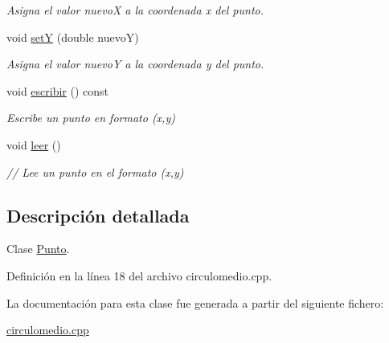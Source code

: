 \begin{DoxyCompactItemize}
\begin{DoxyCompactList}\small\item\em Asigna el valor nuevoX a la coordenada x del punto. \end{DoxyCompactList}\item 
void \hyperlink{classPunto_a6a0f8adb5946f31a7867a06f54d97462}{setY} (double nuevoY)\hypertarget{classPunto_a6a0f8adb5946f31a7867a06f54d97462}{}\label{classPunto_a6a0f8adb5946f31a7867a06f54d97462}

\begin{DoxyCompactList}\small\item\em Asigna el valor nuevoY a la coordenada y del punto. \end{DoxyCompactList}\item 
void \hyperlink{classPunto_afc543b48134f632fa354d8b027954e80}{escribir} () const \hypertarget{classPunto_afc543b48134f632fa354d8b027954e80}{}\label{classPunto_afc543b48134f632fa354d8b027954e80}

\begin{DoxyCompactList}\small\item\em Escribe un punto en formato (x,y) \end{DoxyCompactList}\item 
void \hyperlink{classPunto_a84cc9b0ee2e5b00842e7bff819b80459}{leer} ()\hypertarget{classPunto_a84cc9b0ee2e5b00842e7bff819b80459}{}\label{classPunto_a84cc9b0ee2e5b00842e7bff819b80459}

\begin{DoxyCompactList}\small\item\em // Lee un punto en el formato (x,y) \end{DoxyCompactList}\end{DoxyCompactItemize}


\subsection{Descripción detallada}
Clase \hyperlink{classPunto}{Punto}. 

Definición en la línea 18 del archivo circulomedio.\+cpp.



La documentación para esta clase fue generada a partir del siguiente fichero\+:\begin{DoxyCompactItemize}
\item 
\hyperlink{circulomedio_8cpp}{circulomedio.\+cpp}\end{DoxyCompactItemize}
